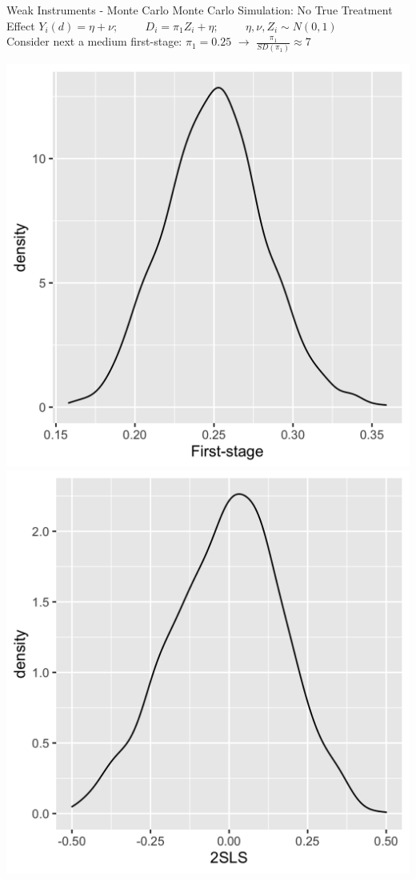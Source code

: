 \documentclass[11pt,english,handout]{beamer}
\begin{document}
\begin{frame}{Weak Instruments - Monte Carlo}
	Monte Carlo Simulation: No True Treatment Effect
	$Y_i(d)= \eta + \nu; \hspace{1cm}  D_i = \pi_1 Z_i + \eta; \hspace{1cm}  \eta, \nu, Z_i \sim N(0,1)$ 	\\
	
	Consider next a medium first-stage: $\pi_1 =0.25$ $\rightarrow$ $\frac{\pi_1}{SD(\pi_1)} \approx 7$
	
	\includegraphics[width = 0.45 \linewidth]{fs-medium} \pause{} \includegraphics[width = 0.45 \linewidth]{iv-medium}
\end{frame}
\end{document}
